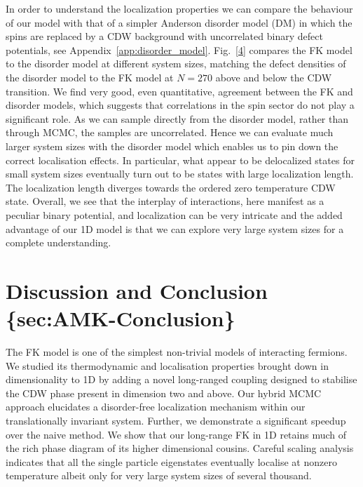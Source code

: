 In order to understand the localization properties we can compare the behaviour of our model with that of a simpler Anderson disorder model (DM) in which the spins are replaced by a CDW background with uncorrelated binary defect potentials, see Appendix~\protect\hyperlink{app:disorder_model}{{[}app:disorder\_model{]}}. Fig.~{[}\protect\hyperlink{fig:indiv_IPR_disorder}{4}{]} compares the FK model to the disorder model at different system sizes, matching the defect densities of the disorder model to the FK model at \(N = 270\) above and below the CDW transition. We find very good, even quantitative, agreement between the FK and disorder models, which suggests that correlations in the spin sector do not play a significant role. As we can sample directly from the disorder model, rather than through MCMC, the samples are uncorrelated. Hence we can evaluate much larger system sizes with the disorder model which enables us to pin down the correct localisation effects. In particular, what appear to be delocalized states for small system sizes eventually turn out to be states with large localization length. The localization length diverges towards the ordered zero temperature CDW state. Overall, we see that the interplay of interactions, here manifest as a peculiar binary potential, and localization can be very intricate and the added advantage of our 1D model is that we can explore very large system sizes for a complete understanding.

\hypertarget{discussion-and-conclusion-secamk-conclusion}{%
\section{Discussion and Conclusion \{sec:AMK-Conclusion\}}\label{discussion-and-conclusion-secamk-conclusion}}

The FK model is one of the simplest non-trivial models of interacting fermions. We studied its thermodynamic and localisation properties brought down in dimensionality to 1D by adding a novel long-ranged coupling designed to stabilise the CDW phase present in dimension two and above. Our hybrid MCMC approach elucidates a disorder-free localization mechanism within our translationally invariant system. Further, we demonstrate a significant speedup over the naive method. We show that our long-range FK in 1D retains much of the rich phase diagram of its higher dimensional cousins. Careful scaling analysis indicates that all the single particle eigenstates eventually localise at nonzero temperature albeit only for very large system sizes of several thousand.

